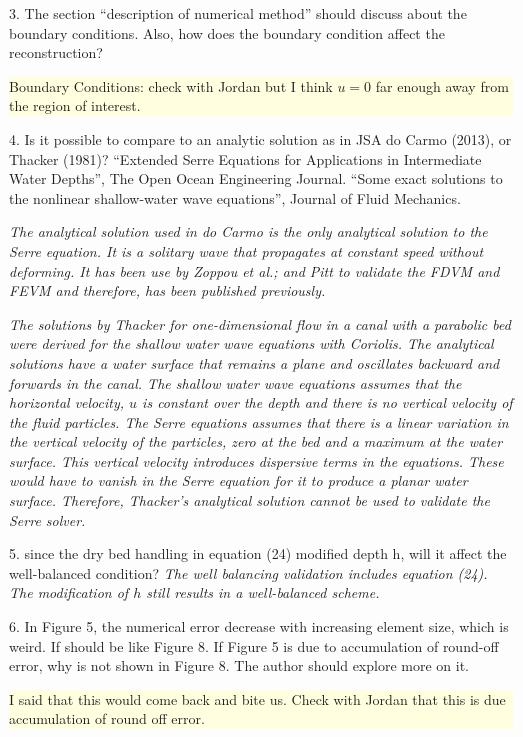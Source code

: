 \documentclass[subeqn]{article}
\newcommand{\hly}[1] {\par\colorbox{lightyellow}{\parbox{\linewidth}{#1}}}
\begin{document}
3. The section “description of numerical method” should discuss about the boundary conditions. Also, how does the boundary condition affect the reconstruction?

\hly{Boundary Conditions: check with Jordan but I think $u=0$ far enough away from the region of interest.}

4. Is it possible to compare to an analytic solution as in JSA do Carmo (2013), or Thacker (1981)?
“Extended Serre Equations for Applications in Intermediate Water Depths”, The Open Ocean Engineering Journal.
“Some exact solutions to the nonlinear shallow-water wave equations”, Journal of Fluid Mechanics.

\emph{The analytical solution used in do Carmo\cite{doCarmo-2013-16} is the only analytical solution to the Serre equation. It is a solitary wave that propagates at constant speed without deforming. It has been use by Zoppou \emph{et al.;} \cite{Zoppou-etal-2016,Zoppou-etal-2017} and Pitt\cite{Pitt-2019} to validate the FDVM and FEVM and therefore, has been published previously.}

\emph{The solutions by Thacker\cite{Thacker-W-81-499} for one-dimensional flow in a canal with a parabolic bed were derived for the shallow water wave equations with Coriolis. The analytical solutions have a water surface that remains a plane and oscillates backward and forwards in the canal. The shallow water wave equations assumes that the horizontal velocity, $u$ is constant over the depth and there is no vertical velocity of the fluid particles. The Serre equations assumes that there is a linear variation in the vertical velocity of the particles, zero at the bed and a maximum at the water surface. This vertical velocity introduces dispersive terms in the equations. These would have to vanish in the Serre equation for it to produce a planar water surface. Therefore, Thacker's analytical solution cannot be used to validate the Serre solver.}

5. since the dry bed handling in equation (24) modified depth h, will it affect the well-balanced condition?
\emph{The well balancing validation includes equation (24). The modification of $h$ still results in a well-balanced scheme.}

6. In Figure 5, the numerical error decrease with increasing element size, which is weird. If should be like Figure 8. If Figure 5 is due to accumulation of round-off error, why is not shown in Figure 8. The author should explore more on it.

\hly{I said that this would come back and bite us. Check with Jordan that this is due accumulation of round off error.}
\end{document}
